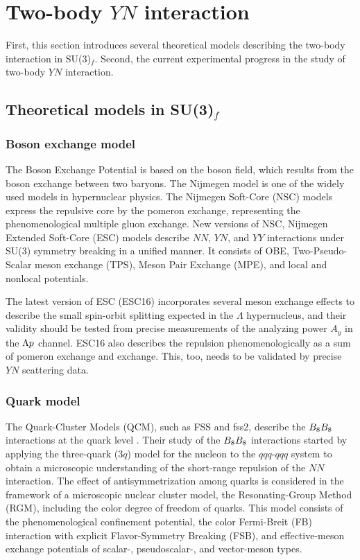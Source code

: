\clearpage
\section{Two-body $YN$ interaction} 
\label{sec-YNint}

First, this section introduces several theoretical models describing the two-body interaction in SU(3)$_f$. Second, the current experimental progress in the study of two-body $YN$ interaction.
\subsection{Theoretical models in SU(3)$_f$}
\subsubsection{Boson exchange model}
The Boson Exchange Potential is based on the boson field, which results from the boson exchange between two baryons. The Nijmegen model is one of the widely used models in hypernuclear physics. The Nijmegen Soft-Core (NSC) models express the repulsive core by the pomeron exchange, representing the phenomenological multiple gluon exchange. New versions of NSC, Nijmegen Extended Soft-Core (ESC) models describe $NN$, $YN$, and $YY$ interactions under SU(3) symmetry breaking in a unified manner. It consists of OBE, Two-Pseudo-Scalar meson exchange (TPS), Meson Pair Exchange (MPE), and local and nonlocal potentials.

The latest version of ESC (ESC16) \cite{ESC16} incorporates several meson exchange effects to describe the small spin-orbit splitting expected in the $\Lambda$ hypernucleus, and their validity should be tested from precise measurements of the analyzing power $A_y$ in the $\Lambda p$ channel. ESC16 also describes the repulsion phenomenologically as a sum of  pomeron exchange and  exchange. This, too, needs to be validated by precise $YN$ scattering data.

\subsubsection{Quark model}
The Quark-Cluster Models (QCM), such as FSS and fss2, describe the $B_{8}B_{8}$ interactions at the quark level \cite{Fujiwara-2007}. Their study of the $B_{8}B_{8}$ interactions started by applying the three-quark ($3q$) model for the nucleon to the $qqq$-$qqq$ system to obtain a microscopic understanding of the short-range repulsion of the $NN$ interaction. The effect of antisymmetrization among quarks is considered in the framework of a microscopic nuclear cluster model, the Resonating-Group Method (RGM), including the color degree of freedom of quarks. This model consists of the phenomenological confinement potential, the color Fermi-Breit (FB) interaction with explicit Flavor-Symmetry Breaking (FSB), and effective-meson exchange potentials of scalar-, pseudoscalar-, and vector-meson types. 

